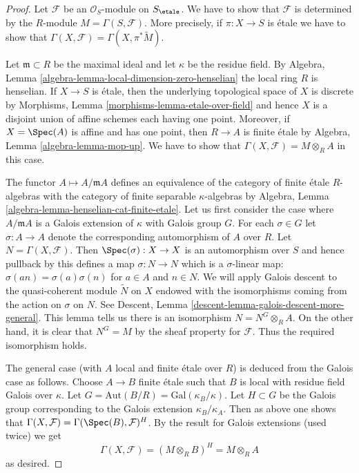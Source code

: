 \begin{proof}
Let $\mathcal{F}$ be an $\mathcal{O}_S$-module on $S_\etale$.
We have to show that $\mathcal{F}$ is determined by the
$R$-module $M = \Gamma(S, \mathcal{F})$.
More precisely, if $\pi : X \to S$ is \'etale we have to
show that $\Gamma(X, \mathcal{F}) = \Gamma(X, \pi^*\widetilde{M})$.

\medskip\noindent
Let $\mathfrak m \subset R$ be the maximal ideal and let
$\kappa$ be the residue field. By
Algebra, Lemma \ref{algebra-lemma-local-dimension-zero-henselian}
the local ring $R$ is henselian. If $X \to S$ is \'etale,
then the underlying topological space of $X$ is discrete
by Morphisms, Lemma \ref{morphisms-lemma-etale-over-field}
and hence $X$ is a disjoint union of affine schemes
each having one point. Moreover, if $X = \Spec(A)$ is affine and
has one point, then $R \to A$ is finite \'etale by
Algebra, Lemma \ref{algebra-lemma-mop-up}.
We have to show that $\Gamma(X, \mathcal{F}) = M \otimes_R A$
in this case.

\medskip\noindent
The functor $A \mapsto A/\mathfrak m A$ defines an equivalence of
the category of finite \'etale $R$-algebras
with the category of finite separable $\kappa$-algebras by
Algebra, Lemma \ref{algebra-lemma-henselian-cat-finite-etale}.
Let us first consider the case where $A/\mathfrak m A$
is a Galois extension of $\kappa$ with Galois group $G$.
For each $\sigma \in G$ let $\sigma : A \to A$ denote the
corresponding automorphism of $A$ over $R$.
Let $N = \Gamma(X, \mathcal{F})$.
Then $\Spec(\sigma) : X \to X$ is an automorphism over $S$
and hence pullback by this defines a map $\sigma : N \to N$
which is a $\sigma$-linear map: $\sigma(an) = \sigma(a) \sigma(n)$
for $a \in A$ and $n \in N$.
We will apply Galois descent to the quasi-coherent module
$\widetilde{N}$ on $X$ endowed with the isomorphisms
coming from the action on $\sigma$ on $N$. See Descent, Lemma
\ref{descent-lemma-galois-descent-more-general}.
This lemma tells us there is an isomorphism $N = N^G \otimes_R A$.
On the other hand, it is clear that $N^G = M$ by the sheaf property
for $\mathcal{F}$. Thus the required isomorphism holds.

\medskip\noindent
The general case (with $A$ local and finite \'etale over $R$)
is deduced from the Galois case as follows. Choose $A \to B$
finite \'etale such that $B$ is local with residue field
Galois over $\kappa$. Let $G = \text{Aut}(B/R) = \text{Gal}(\kappa_B/\kappa)$.
Let $H \subset G$ be the Galois group corresponding to the
Galois extension $\kappa_B/\kappa_A$. Then as above one
shows that $\Gamma(X, \mathcal{F}) = \Gamma(\Spec(B), \mathcal{F})^H$.
By the result for Galois extensions (used twice) we get
$$
\Gamma(X, \mathcal{F}) = (M \otimes_R B)^H = M \otimes_R A
$$
as desired.
\end{proof}








